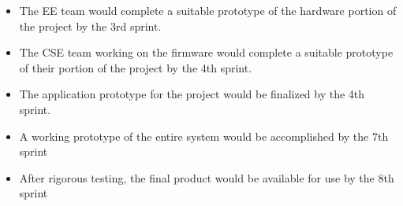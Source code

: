 
\begin{itemize}
  \item The EE team would complete a suitable prototype of the hardware portion of the project by the 3rd sprint.

  \item The CSE team working on the firmware would complete a suitable prototype of their portion of the project by the 4th sprint.

  \item The application prototype for the project would be finalized by the 4th sprint.

  \item A working prototype of the entire system would be accomplished by the 7th sprint

  \item After rigorous testing, the final product would be available for use by the 8th sprint

\end{itemize}